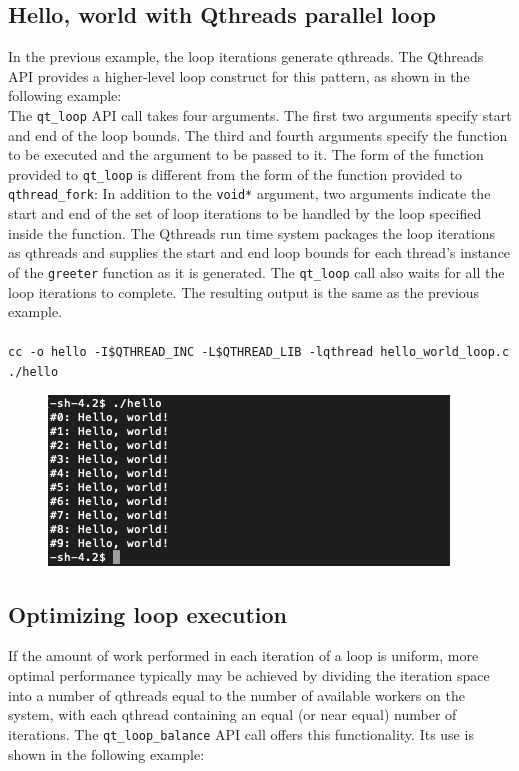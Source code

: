\documentclass[12pt,fullpage]{article}
\begin{document}
\subsection{Hello, world with Qthreads parallel loop}

In the previous example, the loop iterations generate qthreads.  The Qthreads API provides a higher-level loop construct for this pattern, as shown in the following example:
\\


The {\tt qt\_loop} API call takes four arguments.  The first two arguments specify start and end of the loop bounds.  The third and fourth arguments specify the function to be executed and the argument to be passed to it.  The form of the function provided to {\tt qt\_loop} is different from the form of the function provided to {\tt qthread\_fork}:  In addition to the {\tt void*} argument, two arguments indicate the start and end of the set of loop iterations to be handled by the loop specified inside the function.  The Qthreads run time system packages the loop iterations as qthreads and supplies the start and end loop bounds for each thread's instance of the {\tt greeter} function as it is generated.  The {\tt qt\_loop} call also waits for all the loop iterations to complete.  The resulting output is the same as the previous example.
\\ \\
{\footnotesize{\tt cc -o hello -I\$QTHREAD\_INC -L\$QTHREAD\_LIB -lqthread hello\_world\_loop.c}}
\\
{\footnotesize{\tt ./hello}}
\begin{figure}
\includegraphics{images/hello_world_loop.png}
\end{figure}

\subsection{Optimizing loop execution}

If the amount of work performed in each iteration of a loop is uniform, more optimal performance typically may be achieved by dividing the iteration space into a number of qthreads equal to the number of available workers on the system, with each qthread containing an equal (or near equal) number of iterations.  The {\tt qt\_loop\_balance} API call offers this functionality.  Its use is shown in the following example:
\\

\end{document}
